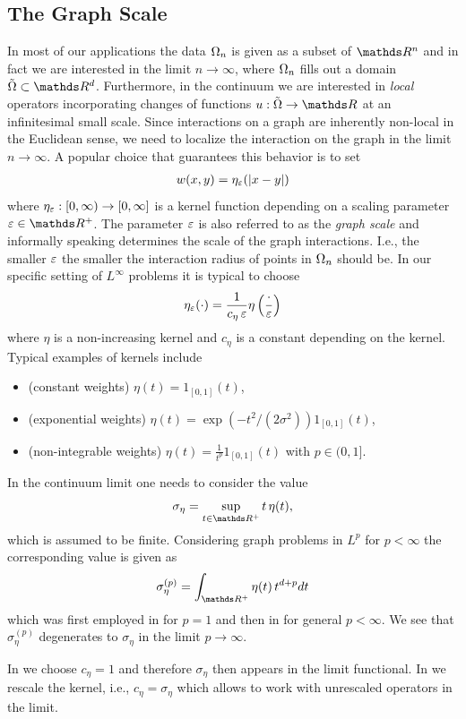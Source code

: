 \subsection{The Graph Scale} 
In most of our applications the data $\Omega_n$ is given as a subset of $\R^n$ and in fact we are interested in the limit $n\to\infty$, where $\Omega_n$ fills out a domain $\tilde\domain\subset\R^d$. Furthermore, in the continuum we are interested in \emph{local} operators incorporating changes of functions $u:\tilde\domain\to\R$ at an infinitesimal small scale. Since interactions on a graph are inherently non-local in the Euclidean sense, we need to localize the interaction on the graph in the limit $n\to\infty$. A popular choice that guarantees this behavior is to set
%
\begin{align*}
w(x,y) = \eta_{\varepsilon}(\left|x-y\right|)
\end{align*}
%
where $\eta_\varepsilon:[0,\infty)\to [0,\infty]$ is a kernel function depending on a scaling parameter $\gscale\in\R^+$. The parameter $\varepsilon$ is also referred to as the \emph{graph scale} and informally speaking determines the scale of the graph interactions. I.e., the smaller $\varepsilon$ the smaller the interaction radius of points in $\Omega_n$ should be. In our specific setting of $L^\infty$ problems it is typical to choose
%
\begin{align*}
\eta_\varepsilon(\cdot) = \frac{1}{c_\eta\, \varepsilon} \eta\left(\frac{\cdot}{\varepsilon}\right)
\end{align*}
%
where $\eta$ is a non-increasing kernel and $c_\eta$ is a constant depending on the kernel. Typical examples of kernels include
%
\begin{itemize}
\item (constant weights) $\eta(t)=1_{[0,1]}(t)$,
\item (exponential weights) $\eta(t)=\exp(-t^2/(2\sigma^2))1_{[0,1]}(t)$,
\item (non-integrable weights) $\eta(t)=\frac{1}{t^p}1_{[0,1]}(t)$ with $p\in(0,1]$.
\end{itemize}
%
%
\begin{remark}{}{}
In the continuum limit one needs to consider the value 
%
\begin{align*}
\sigma_\eta = \sup_{t\in\R^+} t\, \eta(t),
\end{align*}
%
which is assumed to be finite. Considering graph problems in $L^p$ for $p<\infty$
the corresponding value is given as
%
\begin{align*}
\sigma_\eta^{(p)} = \int_{\R^+} \eta(t)\, t^{d+p} dt
\end{align*}
%
which was first employed in \cite{GarcSlep15} for $p=1$ and then in \cite{slepcev2019analysis} for general $p<\infty$. We see that $\sigma_\eta^{(p)}$ degenerates to $\sigma_\eta$ in the limit $p\to\infty$.

In \cite{roith2022continuum} we choose $c_\eta=1$ and therefore $\sigma_\eta$ then appears in the limit functional. In \cite{bungert2021uniform} we rescale the kernel, i.e., $c_\eta = \sigma_\eta$ which allows to work with unrescaled operators in the limit. 
\end{remark}
